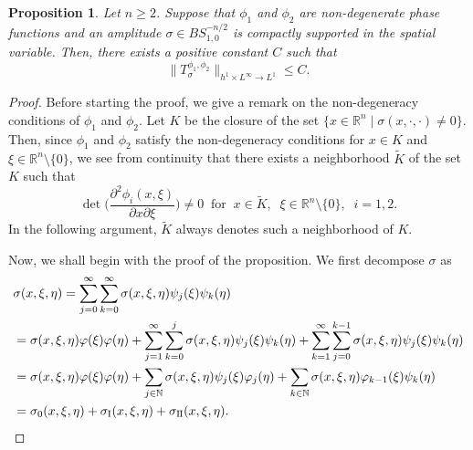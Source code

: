 \documentclass[12pt]{amsart}
\numberwithin{equation}{section}
\theoremstyle{plain}
\newtheorem{prop}[thm]{Proposition}
\theoremstyle{definition}
\newcommand{\N}{\mathbb{N}}
\newcommand{\R}{\mathbb{R}}
\newcommand{\RomI}{\mathrm{I}}
\newcommand{\II}{\mathrm{I}\hspace{-0.5pt}\mathrm{I}}
\begin{document}
\begin{prop}\label{prop-L1} 
Let $n\ge 2$.
Suppose that 
$\phi_1$ and $\phi_2$ are non-degenerate phase functions
and an amplitude 
$\sigma \in BS^{-n/2}_{1,0}$
is compactly supported in the spatial variable.
Then, 
there exists a positive constant $C$ such that
\[
\|T_{\sigma}^{\phi_1, \phi_2}
\|_{h^1 \times L^\infty \to L^1}
\le C.
\]
\end{prop}


\begin{proof}
Before starting the proof,
we give a remark on 
the non-degeneracy conditions of 
$\phi_1$ and $\phi_2$.
Let $K$ be the closure of 
the set 
$\{ x \in \R^n \mid \sigma (x, \cdot , \cdot) \neq 0 \}$.
Then, 
since $\phi_1$ and $\phi_2$ satisfy
the non-degeneracy conditions 
for $x \in {K}$ and $\xi \in \R^n \setminus\{0\}$,
we see from continuity
that there exists a neighborhood 
$\widetilde{K}$ of the set $K$
such that
\begin{equation} \label{ND-n}
\det \Big( \frac{\partial^2 \phi_i (x,\xi)}{\partial{x} \partial{\xi}} \Big) \neq 0
\;\; \text{for}
\;\; x \in \widetilde{K} ,
\;\; \xi \in \R^n \setminus\{0\} ,
\;\; i = 1,2.
\end{equation}
In the following argument,
$\widetilde{K}$ always denotes
such a neighborhood of $K$.


Now, we shall begin with the proof of the proposition.
We first decompose $\sigma$ as 
\begin{align*} &
\sigma (x, \xi, \eta) 
=
\sum_{j=0}^{\infty} 
\sum_{k=0}^{\infty} 
\sigma (x, \xi, \eta) \psi_j (\xi) \psi_k (\eta)
\\&=
\sigma (x, \xi, \eta) \varphi (\xi) \varphi (\eta)
+
\sum_{j=1}^{\infty} 
\sum_{k=0}^{j} 
\sigma (x, \xi, \eta) \psi_j (\xi) \psi_k (\eta)
+
\sum_{k=1}^{\infty} 
\sum_{j=0}^{k-1} 
\sigma (x, \xi, \eta) \psi_j (\xi) \psi_k (\eta)
\\&=
\sigma (x, \xi, \eta) \varphi (\xi) \varphi (\eta)
+
\sum_{j \in \N} 
\sigma (x, \xi, \eta) \psi_{j} (\xi) \varphi_{j} (\eta)
+
\sum_{k \in \N} 
\sigma (x, \xi, \eta) \varphi_{k-1} (\xi) \psi_k (\eta)
\\&=
\sigma_{0} (x, \xi, \eta)
+
\sigma_{\RomI} (x, \xi, \eta)
+
\sigma_{\II} (x, \xi, \eta) .
\end{align*}



\end{proof}
\end{document}
